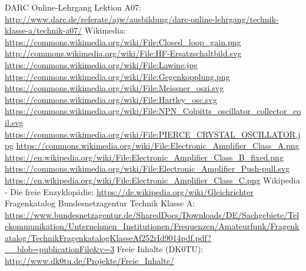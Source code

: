 \begin{thebibliography}{}
      DARC Online-Lehrgang Lektion A07:
                    \url{http://www.darc.de/referate/ajw/ausbildung/darc-online-lehrgang/technik-klasse-a/technik-a07/}
     	Wikimedia:
                    \url{https://commons.wikimedia.org/wiki/File:Closed_loop_gain.png}
                    \url{http://commons.wikimedia.org/wiki/File:HF-Ersatzschaltbild.svg}
                    \url{https://commons.wikimedia.org/wiki/File:Lawine.jpg}
                    \url{https://commons.wikimedia.org/wiki/File:Gegenkopplung.png}
                    \url{https://commons.wikimedia.org/wiki/File:Meissner_oszi.svg}
                    \url{https://commons.wikimedia.org/wiki/File:Hartley_osc.svg}
                    \url{https://commons.wikimedia.org/wiki/File:NPN_Colpitts_oscillator_collector_coil.svg}
                    \url{https://commons.wikimedia.org/wiki/File:PIERCE_CRYSTAL_OSCILLATOR.jpg}
                    \url{https://commons.wikimedia.org/wiki/File:Electronic_Amplifier_Class_A.png}
                    \url{https://en.wikipedia.org/wiki/File:Electronic_Amplifier_Class_B_fixed.png}
                    \url{https://commons.wikimedia.org/wiki/File:Electronic_Amplifier_Push-pull.svg}
                    \url{https://en.wikipedia.org/wiki/File:Electronic_Amplifier_Class_C.png}
                    \url{}
                    \url{}
                    \url{}
                    \url{}
        Wikipedia - Die freie Enzyklopädie:
                    \url{https://de.wikipedia.org/wiki/Gleichrichter}
	   Fragenkatalog Bundesnetzagentur Technik Klasse A:                   
                    \url{https://www.bundesnetzagentur.de/SharedDocs/Downloads/DE/Sachgebiete/Telekommunikation/Unternehmen_Institutionen/Frequenzen/Amateurfunk/Fragenkatalog/TechnikFragenkatalogKlasseAf252rId9014pdf.pdf?__blob=publicationFile&v=3}
        Freie Inhalte (DK0TU):
                    \url{http://www.dk0tu.de/Projekte/Freie_Inhalte/}
\end{thebibliography} 


